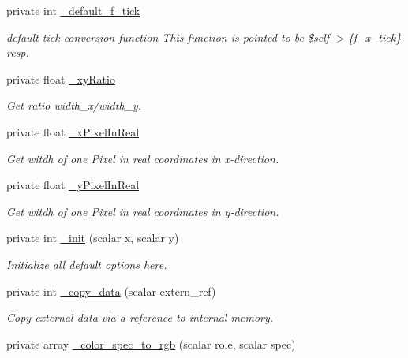 \begin{DoxyCompactItemize}
private int \hyperlink{classChart_1_1Base_a060d522a2f0240cad4c746891d488f80}{\_\-default\_\-f\_\-tick}
\begin{DoxyCompactList}\small\item\em default tick conversion function This function is pointed to be \$self-\/$>$\{f\_\-x\_\-tick\} resp. \item\end{DoxyCompactList}\item 
private float \hyperlink{classChart_1_1Base_a1f3ae34864bf296fafcab63416926b83}{\_\-xyRatio}
\begin{DoxyCompactList}\small\item\em Get ratio width\_\-x/width\_\-y. \item\end{DoxyCompactList}\item 
private float \hyperlink{classChart_1_1Base_ac21e93fb6498ea3137e15fd348e7b9ff}{\_\-xPixelInReal}
\begin{DoxyCompactList}\small\item\em Get witdh of one Pixel in real coordinates in x-\/direction. \item\end{DoxyCompactList}\item 
private float \hyperlink{classChart_1_1Base_afe24ee8f28c900069e65ddd666a242ff}{\_\-yPixelInReal}
\begin{DoxyCompactList}\small\item\em Get witdh of one Pixel in real coordinates in y-\/direction. \item\end{DoxyCompactList}\item 
private int \hyperlink{classChart_1_1Base_a0803aa94dabfc982195cab15392ba7bc}{\_\-init} (scalar x, scalar y)
\begin{DoxyCompactList}\small\item\em Initialize all default options here. \item\end{DoxyCompactList}\item 
private int \hyperlink{classChart_1_1Base_ac704c89b5b4b3f3f0e6fa35d6c5ca6c3}{\_\-copy\_\-data} (scalar extern\_\-ref)
\begin{DoxyCompactList}\small\item\em Copy external data via a reference to internal memory. \item\end{DoxyCompactList}\item 
private array \hyperlink{classChart_1_1Base_a6a97b446c6c2f646dddd7f2a0076ba2e}{\_\-color\_\-spec\_\-to\_\-rgb} (scalar role, scalar spec)

\end{DoxyCompactItemize}
